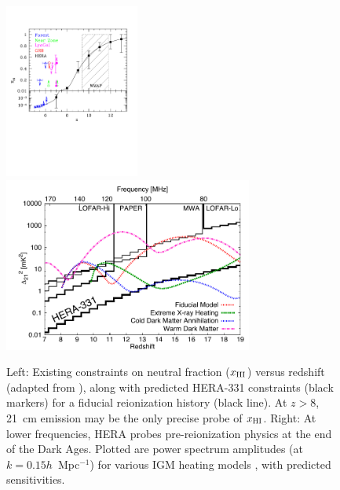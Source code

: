 \documentclass[preprint]{aastex}
\newcommand{\Mycitep}[1]{{\bf \citep{#1}}}
\newcommand{\Mycitealt}[1]{{\bf \citealt{#1}}}
\newcommand{\Caption}[4]{\vspace{#1}\renewcommand{\baselinestretch}{#2}\caption{#4}\vspace{#3}}
\def\HI{{H{\small I }}}
\def\xHI{{x_{\rm\HI}}}
\begin{document}
\begin{figure}[t]\centering
\includegraphics[height=2.25in,trim=0.8cm 9cm 1.75cm 3.6cm,clip]{plots/IonizationHistory/HERA331_ion_hist.pdf}
\includegraphics[height=2.25in]{plots/Xray/HERA_II_compare_kp1_whoriz_20pt.pdf}
\Caption{-0.1in}{0.99}{-0.1in}{\small
Left:
Existing
constraints on neutral fraction ($\xHI$) versus redshift (adapted from \Mycitealt{robertson_2013}), along with
predicted HERA-331 constraints (black markers)
for a fiducial
reionization history (black line).
At $z>8$,
21~cm emission may be the only precise probe of $\xHI$.
Right: At lower frequencies, HERA probes
pre-reionization physics at the end of the Dark Ages. Plotted are power spectrum amplitudes (at $k =
0.15h$~Mpc$^{-1}$) for various IGM heating models \Mycitep{mesinger_et_al2013},
with predicted sensitivities.
}\label{fig:x_i_vs_z} \end{figure}



\end{document}
